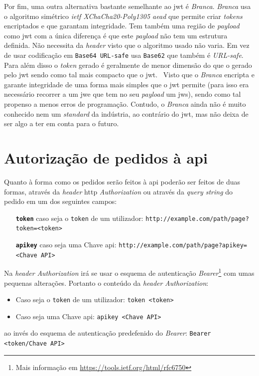 Por fim, uma outra alternativa bastante semelhante ao \acrshort{jwt} é \textit{Branca}. \textit{Branca} usa o algoritmo simétrico \textit{\acrshort{ietf} XChaCha20-Poly1305 \acrshort{aead}} que permite criar \textit{tokens} encriptados e que garantam integridade. Tem também uma região de \textit{payload} como \acrshort{jwt} com a única diferença é que este \textit{payload} não tem um estrutura definida. Não necessita da \textit{header} visto que o algoritmo usado não varia. Em vez de usar codificação em \texttt{Base64 URL-safe} usa \texttt{Base62} que também é \textit{URL-safe}. Para além disso o \textit{token} gerado é geralmente de menor dimensão do que o gerado pelo \acrshort{jwt} sendo como tal mais compacto que o \acrshort{jwt}.~\cite{branca} Visto que o \textit{Branca} encripta e garante integridade de uma forma mais simples que o \acrshort{jwt} permite (para isso era necessário recorrer a um \acrshort{jwe} que tem no seu \textit{payload} um \acrshort{jws}), sendo como tal propenso a menos erros de programação. Contudo, o \textit{Branca} ainda não é muito conhecido nem um \textit{standard} da indústria, ao contrário do \acrshort{jwt}, mas não deixa de ser algo a ter em conta para o futuro. 

\section{Autorização de pedidos à \acrshort{api}}

Quanto à forma como os pedidos serão feitos à \acrshort{api} poderão ser feitos de duas formas, através da \textit{header} \acrshort{http} \textit{Authorization} ou através da \textit{query string} do pedido em um dos seguintes campos:
\begin{itemize}[leftmargin=3cm]
    \item[\textbf{\texttt{token}}] caso seja o \texttt{token} de um utilizador:\newline
        \verb|http://example.com/path/page?token=<token>|
    \item[\textbf{\texttt{apikey}}] caso seja uma Chave \acrshort{api}:\newline
        \verb|http://example.com/path/page?apikey=<Chave API>|
\end{itemize}

Na \textit{header} \textit{Authorization} irá se usar o esquema de autenticação \textit{Bearer}\footnote{Mais informação em \url{https://tools.ietf.org/html/rfc6750}} com umas pequenas alterações. Portanto o conteúdo da \textit{header} \textit{Authorization}:
\begin{itemize}[leftmargin=2cm]
    \item Caso seja o \texttt{token} de um utilizador:\newline
        \verb|token <token>|
    \item Caso seja uma Chave \acrshort{api}:\newline
        \verb|apikey <Chave API>|
\end{itemize}
ao invés do esquema de autenticação predefenido do \textit{Bearer}: \verb|Bearer <token/Chave API>|

